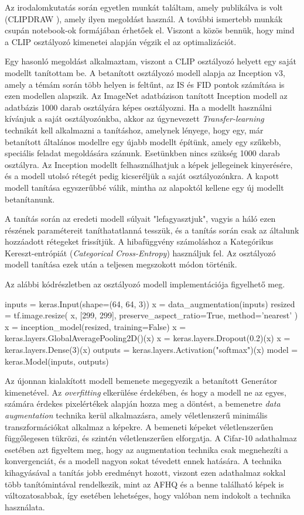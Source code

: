Az irodalomkutatás során egyetlen munkát találtam, amely publikálva is volt (CLIP\-DRAW \cite{frans2021clipdraw}), amely ilyen megoldást használ. A további ismertebb munkák csupán notebook-ok formájában érhetőek el. Viszont a közös bennük, hogy mind a CLIP \cite{radford2021learning} osztályozó kimenetei alapján végzik el az optimalizációt.

Egy hasonló megoldást alkalmaztam, viszont a CLIP osztályozó helyett egy saját modellt tanítottam be. A betanított osztályozó modell alapja az Inception v3, amely a témám során több helyen is feltűnt, az IS és FID pontok számítása is ezen modellen alapszik. Az ImageNet \cite{deng2009imagenet} adatbázison tanított Inception modell az adatbázis 1000 darab osztályára képes osztályozni. Ha a modellt használni kívánjuk a saját osztályozónkba, akkor az úgynevezett \textit{Transfer-learning} \cite{tensorflow} technikát kell alkalmazni a tanításhoz, amelynek lényege, hogy egy, már betanított általános modellre egy újabb modellt építünk, amely egy szűkebb, speciális feladat megoldására szánunk. Esetünkben nincs szükség 1000 darab osztályra. Az Inception modellt felhasználhatjuk a képek jellegeinek kinyerésére, és a modell utolsó rétegét pedig kicseréljük a saját osztályozónkra. A kapott modell tanítása egyszerűbbé válik, mintha az alapoktól kellene egy új modellt betanítanunk.

A tanítás során az eredeti modell súlyait "lefagyasztjuk", vagyis a háló ezen részének paramétereit taníthatatlanná tesszük, és a tanítás során csak az általunk hozzáadott rétegeket frissítjük.
A hibafüggvény számoláshoz a Kategórikus Kereszt-entrópiát (\textit{Categorical Cross-Entropy}) használjuk fel. Az osztályozó modell tanítása ezek után a teljesen megszokott módon történik.

Az alábbi kódrészletben az osztályozó modell implementációja figyelhető meg.
\begin{python}
inputs = keras.Input(shape=(64, 64, 3))
x = data_augmentation(inputs)
resized = tf.image.resize(
    x, [299, 299],
    preserve_aspect_ratio=True, method='nearest'
)
x = inception_model(resized, training=False)
x = keras.layers.GlobalAveragePooling2D()(x)
x = keras.layers.Dropout(0.2)(x)
x = keras.layers.Dense(3)(x)
outputs = keras.layers.Activation("softmax")(x)
model = keras.Model(inputs, outputs)
\end{python}

Az újonnan kialakított modell bemenete megegyezik a betanított Generátor kimenetével. Az \textit{overfitting} elkerülése érdekében, és hogy a modell ne az egyes, számára érdekes pixelértékek alapján hozza meg a döntést, a bemenetre \textit{data augmentation} technika kerül alkalmazásra, amely véletlenszerű minimális transzformációkat alkalmaz a képekre. A bemeneti képeket véletlenszerűen függőlegesen tükrözi, és szintén véletlenszerűen elforgatja. A Cifar-10 adathalmaz esetében azt figyeltem meg, hogy az augmentation technika csak megnehezíti a konvergenciát, és a modell nagyon sokat tévedett ennek hatására. A technika kihagyásával a tanítás jobb eredményt hozott, viszont ezen adathalmaz sokkal több tanítómintával rendelkezik, mint az AFHQ és a benne található képek is változatosabbak, így esetében lehetséges, hogy valóban nem indokolt a technika használata.

